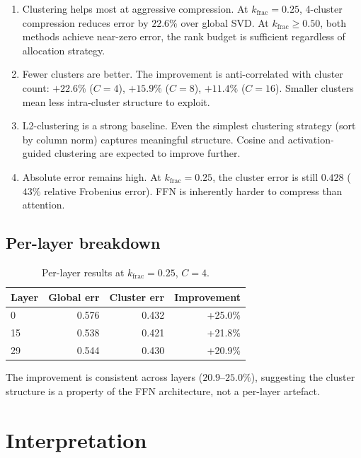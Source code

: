 \documentclass[11pt]{article}
\begin{document}
\begin{enumerate}
\item Clustering helps most at aggressive compression.
      At $k_\text{frac}{=}0.25$, 4-cluster compression reduces error by
      $22.6\%$ over global SVD.  At $k_\text{frac}{\ge}0.50$, both
      methods achieve near-zero error, the rank budget is sufficient
      regardless of allocation strategy.

\item Fewer clusters are better.  The improvement is
      anti-correlated with cluster count: $+22.6\%$ ($C{=}4$),
      $+15.9\%$ ($C{=}8$), $+11.4\%$ ($C{=}16$).  Smaller clusters
      mean less intra-cluster structure to exploit.

\item L2-clustering is a strong baseline.  Even the simplest
      clustering strategy (sort by column norm) captures meaningful
      structure.  Cosine and activation-guided clustering are expected
      to improve further.

\item Absolute error remains high.  At $k_\text{frac}{=}0.25$,
      the cluster error is still $0.428$ ($43\%$ relative Frobenius
      error).  FFN is inherently harder to compress than attention.
\end{enumerate}

\subsection{Per-layer breakdown}

\begin{table}[h]\centering\small
\caption{Per-layer results at $k_\text{frac}{=}0.25$, $C{=}4$.}
\label{tab:ffn-per-layer}
\begin{tabular}{@{}lrrr@{}}
\toprule
Layer & Global err & Cluster err & Improvement \\
\midrule
0  & 0.576 & 0.432 & +25.0\% \\
15 & 0.538 & 0.421 & +21.8\% \\
29 & 0.544 & 0.430 & +20.9\% \\
\bottomrule
\end{tabular}
\end{table}

The improvement is consistent across layers ($20.9$--$25.0\%$), suggesting
the cluster structure is a property of the FFN architecture, not a
per-layer artefact.

\section{Interpretation}
\label{sec:interpretation}
\end{document}
